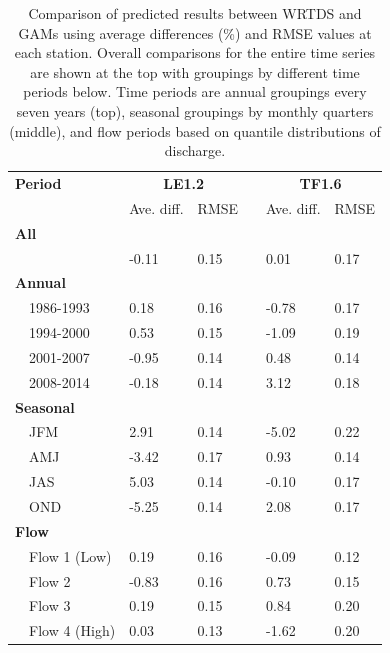 \documentclass[letterpaper,12pt,oneside]{article}\usepackage[]{graphicx}\usepackage[]{color}
\begin{document}
\begin{table}[!tbp]
\caption{Comparison of predicted results between \ac{WRTDS} and \acp{GAM} using average differences (\%) and \ac{RMSE} values at each station.  Overall comparisons for the entire time series are shown at the top with groupings by different time periods below.  Time periods are annual groupings every seven years (top), seasonal groupings by monthly quarters (middle), and flow periods based on quantile distributions of discharge.\label{tab:perfbtw}} 
\begin{center}
\begin{tabular}{lllcll}
\hline\hline
\multicolumn{1}{l}{\bfseries Period}&\multicolumn{2}{c}{\bfseries LE1.2}&\multicolumn{1}{c}{\bfseries }&\multicolumn{2}{c}{\bfseries TF1.6}\tabularnewline
\cline{2-3} \cline{5-6}
\multicolumn{1}{l}{}&\multicolumn{1}{c}{Ave. diff.}&\multicolumn{1}{c}{\ac{RMSE}}&\multicolumn{1}{c}{}&\multicolumn{1}{c}{Ave. diff.}&\multicolumn{1}{c}{\ac{RMSE}}\tabularnewline
\hline
{\bfseries All}&&&&&\tabularnewline
~~&-0.11&0.15&& 0.01&0.17\tabularnewline
\hline
{\bfseries Annual}&&&&&\tabularnewline
~~1986-1993& 0.18&0.16&&-0.78&0.17\tabularnewline
~~1994-2000& 0.53&0.15&&-1.09&0.19\tabularnewline
~~2001-2007&-0.95&0.14&& 0.48&0.14\tabularnewline
~~2008-2014&-0.18&0.14&& 3.12&0.18\tabularnewline
\hline
{\bfseries Seasonal}&&&&&\tabularnewline
~~JFM& 2.91&0.14&&-5.02&0.22\tabularnewline
~~AMJ&-3.42&0.17&& 0.93&0.14\tabularnewline
~~JAS& 5.03&0.14&&-0.10&0.17\tabularnewline
~~OND&-5.25&0.14&& 2.08&0.17\tabularnewline
\hline
{\bfseries Flow}&&&&&\tabularnewline
~~Flow 1 (Low)& 0.19&0.16&&-0.09&0.12\tabularnewline
~~Flow 2&-0.83&0.16&& 0.73&0.15\tabularnewline
~~Flow 3& 0.19&0.15&& 0.84&0.20\tabularnewline
~~Flow 4 (High)& 0.03&0.13&&-1.62&0.20\tabularnewline
\hline
\end{tabular}\end{center}

\end{table}
\end{document}
